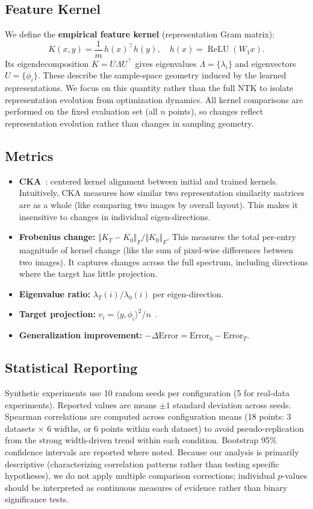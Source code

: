 \documentclass[twoside,11pt]{article}
\newcommand{\DK}{{\Vert K_{T}-K_{0}\Vert_{F}/\Vert K_{0}\Vert_{F}}}
\begin{document}
\subsection{Feature Kernel}
We define the \textbf{empirical feature kernel} (representation Gram matrix):
\[
K(x,y)=\frac{1}{m}\,h(x)^{\top}h(y),\quad h(x)=\operatorname{ReLU}(W_{1}x).
\]
Its eigendecomposition $K=U\Lambda U^{\top}$ gives eigenvalues $\Lambda=\{\lambda_{i}\}$ and eigenvectors $U=\{\phi_{i}\}$. These describe the sample-space geometry induced by the learned representations.  We focus on this quantity rather than the full NTK to isolate representation evolution from optimization dynamics.  All kernel comparisons are performed on the fixed evaluation set (all $n$ points), so changes reflect representation evolution rather than changes in sampling geometry.

\subsection{Metrics}
\begin{itemize}
    \item \textbf{CKA}~\citep{kornblith2019similarity}: centered kernel alignment between initial and trained kernels. Intuitively, CKA measures how similar two representation similarity matrices are as a whole (like comparing two images by overall layout). This makes it insensitive to changes in individual eigen-directions.
    \item \textbf{Frobenius change:} $\DK$. This measures the total per-entry magnitude of kernel change (like the sum of pixel-wise differences between two images). It captures changes across the full spectrum, including directions where the target has little projection.
    \item \textbf{Eigenvalue ratio:} $\lambda_{T}(i)/\lambda_{0}(i)$ per eigen-direction.
    \item \textbf{Target projection:} $v_{i}=\langle y,\phi_{i}\rangle^{2}/n$~\citep{canatar2021spectral}.
    \item \textbf{Generalization improvement:} $-\Delta\text{Error}=\text{Error}_{0}-\text{Error}_{T}$.
\end{itemize}

\subsection{Statistical Reporting}
Synthetic experiments use 10 random seeds per configuration (5 for real-data experiments).  Reported values are means $\pm 1$ standard deviation across seeds.  Spearman correlations are computed across configuration means (18 points: 3 datasets $\times$ 6 widths, or 6 points within each dataset) to avoid pseudo-replication from the strong width-driven trend within each condition.  Bootstrap 95\% confidence intervals are reported where noted.  Because our analysis is primarily descriptive (characterizing correlation patterns rather than testing specific hypotheses), we do not apply multiple comparison corrections; individual $p$-values should be interpreted as continuous measures of evidence rather than binary significance tests.
\end{document}
